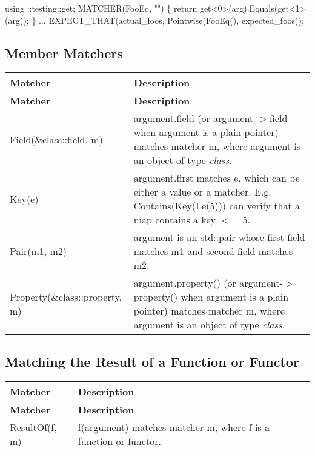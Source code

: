 \begin{DoxyCode}
using ::testing::get;
MATCHER(FooEq, \textcolor{stringliteral}{""}) \{
  \textcolor{keywordflow}{return} get<0>(arg).Equals(get<1>(arg));
\}
...
EXPECT\_THAT(actual\_foos, Pointwise(FooEq(), expected\_foos));
\end{DoxyCode}


\subsection*{Member Matchers}

\tabulinesep=1mm
\begin{longtabu} spread 0pt [c]{*{2}{|X[-1]}|}
\hline
\rowcolor{\tableheadbgcolor}\textbf{ Matcher }&\textbf{ Description  }\\
\endfirsthead
\hline
\endfoot
\hline
\rowcolor{\tableheadbgcolor}\textbf{ Matcher }&\textbf{ Description  }\\
\endhead
{\ttfamily Field(\&class\+::field, m)}&{\ttfamily argument.\+field} (or {\ttfamily argument-\/$>$field} when {\ttfamily argument} is a plain pointer) matches matcher {\ttfamily m}, where {\ttfamily argument} is an object of type {\itshape class}. \\
{\ttfamily Key(e)}&{\ttfamily argument.\+first} matches {\ttfamily e}, which can be either a value or a matcher. E.\+g. {\ttfamily Contains(Key(\+Le(5)))} can verify that a {\ttfamily map} contains a key {\ttfamily $<$= 5}. \\
{\ttfamily Pair(m1, m2)}&{\ttfamily argument} is an {\ttfamily std\+::pair} whose {\ttfamily first} field matches {\ttfamily m1} and {\ttfamily second} field matches {\ttfamily m2}. \\
{\ttfamily Property(\&class\+::property, m)}&{\ttfamily argument.\+property()} (or {\ttfamily argument-\/$>$property()} when {\ttfamily argument} is a plain pointer) matches matcher {\ttfamily m}, where {\ttfamily argument} is an object of type {\itshape class}. \\
\end{longtabu}
\subsection*{Matching the Result of a Function or Functor}

\tabulinesep=1mm
\begin{longtabu} spread 0pt [c]{*{2}{|X[-1]}|}
\hline
\rowcolor{\tableheadbgcolor}\textbf{ Matcher }&\textbf{ Description  }\\
\endfirsthead
\hline
\endfoot
\hline
\rowcolor{\tableheadbgcolor}\textbf{ Matcher }&\textbf{ Description  }\\
\endhead
{\ttfamily Result\+Of(f, m)}&{\ttfamily f(argument)} matches matcher {\ttfamily m}, where {\ttfamily f} is a function or functor. \\
\end{longtabu}
